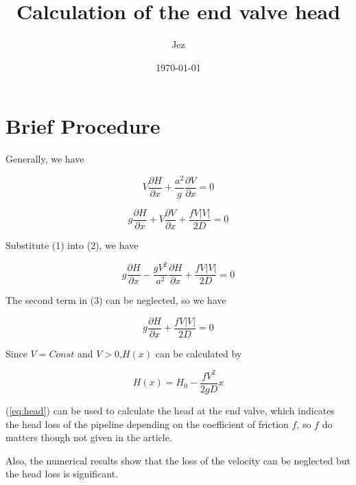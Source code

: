 \documentclass{article}
\newcommand{\pd}[2]{\frac{\partial #1}{\partial #2}}
\begin{document}
\title{Calculation of the end valve head}
\author{Jez}
\date{\today}

\maketitle

\section{Brief Procedure}

Generally, we have

\begin{equation}
    V\frac{\partial H}{\partial x}+\frac{a^2}{g}\frac{\partial V}{\partial x}=0
\end{equation}

\begin{equation}
    g\pd{H}{x}+V\pd{V}{x}+\frac{fV|V|}{2D}=0
\end{equation}

\noindent Substitute (1) into (2), we have

\begin{equation}
    g\pd{H}{x}-\frac{gV^2}{a^2}\pd{H}{x}+\frac{fV|V|}{2D}=0
\end{equation}

\noindent The second term in (3) can be neglected, so we have

\begin{equation}
    g\pd{H}{x}+\frac{fV|V|}{2D}=0
\end{equation}

\noindent Since $V = Const$ and $V > 0$,$H(x)$ can be calculated by

\begin{equation}
    H(x) = H_0 - \frac{fV^2}{2gD}x
    \label{eq:head}
\end{equation}

(\ref{eq:head}) can be used to calculate the head at the end valve, which indicates the head loss of the pipeline depending on the coefficient of friction $f$, so $f$ do matters though not given in the article.

Also, the numerical results show that the loss of the velocity can be neglected but the head loss is significant.
\end{document}
